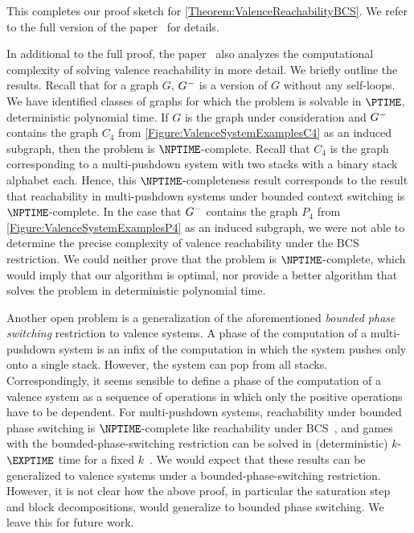 \documentclass[../../diss.tex]{subfiles}
\begin{document}
This completes our proof sketch for \cref{Theorem:ValenceReachabilityBCS}.
We refer to the full version of the paper~\cite{MeyerMZ18a} for details.

In additional to the full proof, the paper~\cite{MeyerMZ18,MeyerMZ18a} also analyzes the computational complexity of solving valence reachability in more detail.
We briefly outline the results.
Recall that for a graph $G$, ${G}^{-}$ is a version of $G$ without any self-loops.
We have identified classes of graphs for which the problem is solvable in $\PTIME$, \ie deterministic polynomial time.
If $G$ is the graph under consideration and ${G}^{-}$ contains the graph $C_4$ from \cref{Figure:ValenceSystemExamplesC4} as an induced subgraph, then the problem is $\NPTIME$-complete.
Recall that $C_4$ is the graph corresponding to a multi-pushdown system with two stacks with a binary stack alphabet each.
Hence, this $\NPTIME$-completeness result corresponds to the result that reachability in multi-pushdown systems under bounded context switching is $\NPTIME$-complete.
In the case that ${G}^{-}$ contains the graph $P_4$ from \cref{Figure:ValenceSystemExamplesP4} as an induced subgraph, we were not able to determine the precise complexity of valence reachability under the BCS restriction.
We could neither prove that the problem is $\NPTIME$-complete, which would imply that our algorithm is optimal, nor provide a better algorithm that solves the problem in deterministic polynomial time.

Another open problem is a generalization of the aforementioned \emph{bounded phase switching} restriction to valence systems.
A phase of the computation of a multi-pushdown system is an infix of the computation in which the system pushes only onto a single stack.
However, the system can pop from all stacks.
Correspondingly, it seems sensible to define a phase of the computation of a valence system as a sequence of operations in which only the positive operations have to be dependent.
For multi-pushdown systems, reachability under bounded phase switching is $\NPTIME$-complete like reachability under BCS~\cite{TorreMP07}, and games with the bounded-phase-switching restriction can be solved in (deterministic) $k$-$\EXPTIME$ time for a fixed $k$~\cite{Seth09}.
We would expect that these results can be generalized to valence systems under a bounded-phase-switching restriction.
However, it is not clear how the above proof, in particular the saturation step and block decompositions, would generalize to bounded phase switching.
We leave this for future work.
\end{document}

